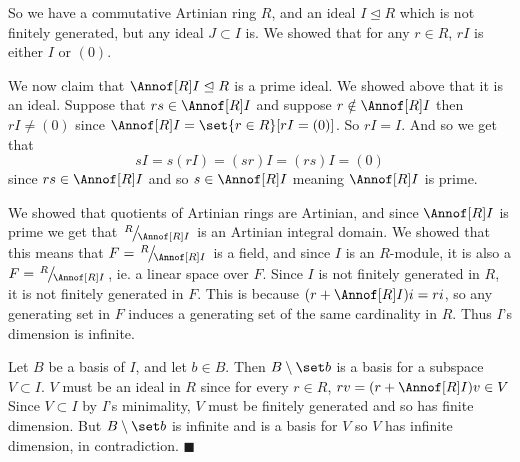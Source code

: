\documentclass[10pt]{article}
\let\ideal=\trianglelefteq
\def\qed{\hskip1cm\hbox{}\hfill$\blacksquare$}
\begin{document}
\begin{blankpp}

    So we have a commutative Artinian ring $R$, and an ideal $I\ideal R$ which is not finitely generated, but any ideal $J\subset I$ is.
    We showed that for any $r\in R$, $rI$ is either $I$ or $(0)$.

    We now claim that $\Annof[R]I\ideal R$ is a prime ideal.
    We showed above that it is an ideal.
    Suppose that $rs\in\Annof[R]I$ and suppose $r\notin\Annof[R]I$ then $rI\neq(0)$ since $\Annof[R]I=\set{r\in R}[rI=(0)]$.
    So $rI=I$.
    And so we get that
    \[ sI = s(rI) = (sr)I = (rs)I = (0) \]
    since $rs\in\Annof[R]I$ and so $s\in\Annof[R]I$ meaning $\Annof[R]I$ is prime.

    We showed that quotients of Artinian rings are Artinian, and since $\Annof[R]I$ is prime we get that $\slfrac R{\Annof[R]I}$ is an Artinian integral domain.
    We showed that this means that $F=\slfrac R{\Annof[R]I}$ is a field, and since $I$ is an $R$-module, it is also a $F=\slfrac R{\Annof[R]I}$, ie. a linear space over $F$.
    Since $I$ is not finitely generated in $R$, it is not finitely generated in $F$.
    This is because $(r+\Annof[R]I)i=ri$, so any generating set in $F$ induces a generating set of the same cardinality in $R$.
    Thus $I$'s dimension is infinite.

    Let $B$ be a basis of $I$, and let $b\in B$.
    Then $B\setminus\set b$ is a basis for a subspace $V\subset I$.
    $V$ must be an ideal in $R$ since for every $r\in R$, $rv=(r+\Annof[R]I)v\in V$ 
    Since $V\subset I$ by $I$'s minimality, $V$ must be finitely generated and so has finite dimension.
    But $B\setminus\set b$ is infinite and is a basis for $V$ so $V$ has infinite dimension, in contradiction.
    \qed

\end{blankpp}
\end{document}
